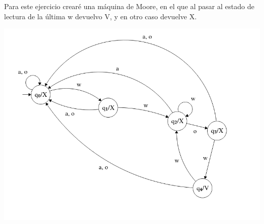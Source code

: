 \documentclass[12pt, spanish]{article}
\begin{document}
Para este ejercicio crearé una máquina de Moore, en el que al pasar al estado de lectura de la última w devuelvo V, y en otro caso devuelve X.



\begin{center}
	\includegraphics[scale=0.5]{aut4.png}
\end{center}
\end{document}
